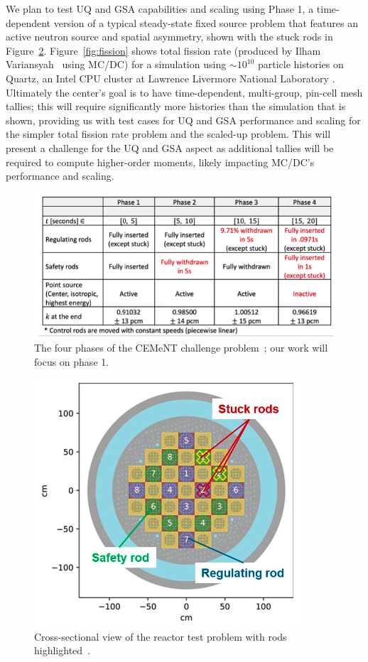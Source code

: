 We plan to test UQ and GSA capabilities and scaling using Phase 1, a time-dependent version of a typical steady-state fixed source problem that features an active neutron source and spatial asymmetry, shown with the stuck rods in Figure~\ref{fig:smr}. Figure~\ref{fig:fission} shows total fission rate (produced by Ilham Variansyah~\cite{psaap-presentation} using MC/DC) for a simulation using $\sim 10^{10}$ particle histories on Quartz, an Intel CPU cluster at Lawrence Livermore National Laboratory \cite{quartz}. Ultimately the center's goal is to have time-dependent, multi-group, pin-cell mesh tallies; this will require significantly more histories than the simulation that is shown, providing us with test cases for UQ and GSA performance and scaling for the simpler total fission rate problem and the scaled-up problem. This will present a challenge for the UQ and GSA aspect as additional tallies will be required to compute higher-order moments, likely impacting MC/DC's performance and scaling. 

\begin{figure}
    \centering
    \includegraphics[width=\textwidth]{Figures/phases.png}
    \caption{The four phases of the CEMeNT challenge problem~\cite{psaap-presentation}; our work will focus on phase 1.}
    \label{fig:phases}
\end{figure}

\begin{figure}
    \centering
    \includegraphics[scale=0.9]{Figures/smr.png}
    \caption{Cross-sectional view of the reactor test problem with rods highlighted~\cite{psaap-presentation}.}
    \label{fig:smr}
\end{figure}

